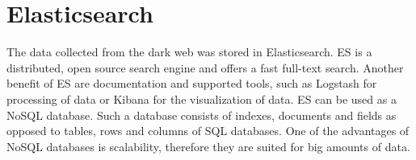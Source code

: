 \section{Elasticsearch}  \label{Elasticsearch}
The data collected from the dark web was stored in Elasticsearch. ES is a distributed, open source search engine \cite{elasticSearch} and offers a fast full-text search. Another benefit of ES are documentation and supported tools, such as Logstash \cite{logstash} for processing of data or Kibana \cite{kibana} for the visualization of data. ES can be used as a NoSQL database. Such a database consists of indexes, documents and fields as opposed to tables, rows and columns of SQL databases.  One of the advantages of NoSQL databases is scalability, therefore they are suited for big amounts of data. 